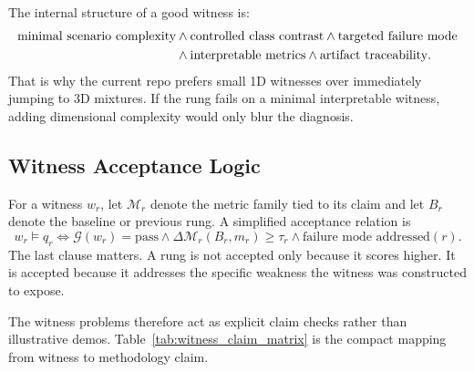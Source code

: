\documentclass[11pt]{article}
\begin{document}
The internal structure of a good witness is:
\begin{align}
\text{minimal scenario complexity}
&\land
\text{controlled class contrast}
\land
\text{targeted failure mode}
\notag \\
&\land
\text{interpretable metrics}
\land
\text{artifact traceability}.
\end{align}
That is why the current repo prefers small 1D witnesses over immediately
jumping to 3D mixtures. If the rung fails on a minimal interpretable witness,
adding dimensional complexity would only blur the diagnosis.

\subsection*{Witness Acceptance Logic}
For a witness \(w_r\), let \(\mathcal{M}_r\) denote the metric family tied to
its claim and let \(B_r\) denote the baseline or previous rung. A simplified
acceptance relation is
\begin{equation}
w_r \models q_r
\iff
\mathcal{G}(w_r)=\mathrm{pass}
\land
\Delta \mathcal{M}_r(B_r,m_r) \ge \tau_r
\land
\text{failure mode addressed}(r).
\end{equation}
The last clause matters. A rung is not accepted only because it scores higher.
It is accepted because it addresses the specific weakness the witness was
constructed to expose.

The witness problems therefore act as explicit claim checks rather than
illustrative demos. Table~\ref{tab:witness_claim_matrix} is the compact mapping
from witness to methodology claim.
\end{document}
